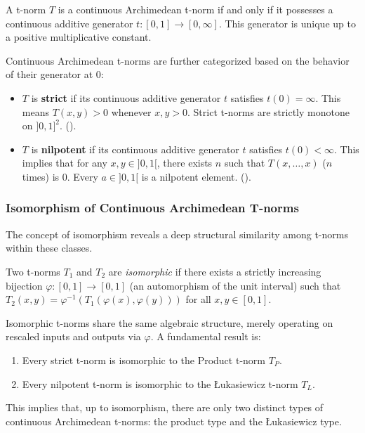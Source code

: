 \begin{theorem}
  A t-norm $T$ is a continuous Archimedean t-norm if and only if it possesses a continuous additive generator $t: [0,1] \to [0,\infty]$. This generator is unique up to a positive multiplicative constant.
\end{theorem}
Continuous Archimedean t-norms are further categorized based on the behavior of their generator at $0$:
\begin{itemize}
    \item $T$ is \textbf{strict} if its continuous additive generator $t$ satisfies $t(0)=\infty$. This means $T(x,y)>0$ whenever $x,y > 0$. Strict t-norms are strictly monotone on $]0,1]^2$. (\cite[Cor.~3.30(i), p.~88; Def.~2.13(i), p.~42]{Klement2000}).
    \item $T$ is \textbf{nilpotent} if its continuous additive generator $t$ satisfies $t(0)<\infty$. This implies that for any $x,y \in ]0,1[$, there exists $n$ such that $T(x, \dots, x)$ ($n$ times) is $0$. Every $a \in ]0,1[$ is a nilpotent element. (\cite[Cor.~3.30(ii), p.~88; Def.~2.13(ii), p.~42]{Klement2000}).
\end{itemize}

\subsubsection{Isomorphism of Continuous Archimedean T-norms}
The concept of isomorphism reveals a deep structural similarity among t-norms within these classes.
\begin{definition}
  Two t-norms $T_1$ and $T_2$ are \emph{isomorphic} if there exists a strictly increasing bijection $\varphi: [0,1] \to [0,1]$ (an automorphism of the unit interval) such that $T_2(x,y) = \varphi^{-1}(T_1(\varphi(x), \varphi(y)))$ for all $x,y \in [0,1]$.
\end{definition}
Isomorphic t-norms share the same algebraic structure, merely operating on rescaled inputs and outputs via $\varphi$. A fundamental result is:
\begin{proposition}
  \begin{enumerate}
      \item Every strict t-norm is isomorphic to the Product t-norm $T_P$.
      \item Every nilpotent t-norm is isomorphic to the Łukasiewicz t-norm $T_L$.
  \end{enumerate}
\end{proposition}
This implies that, up to isomorphism, there are only two distinct types of continuous Archimedean t-norms: the product type and the Łukasiewicz type.

